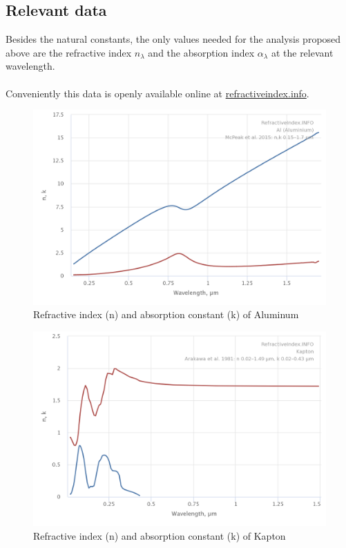\documentclass[14pt]{article}
\begin{document}
\subsection{Relevant data}

Besides the natural constants, the only values needed for the analysis proposed above are the refractive index $n_{\lambda}$
and the absorption index $\alpha_{\lambda}$ at the relevant wavelength.\\
\\
Conveniently this data is openly available online at \hyperref{https://refractiveindex.info}{}{}{refractiveindex.info}\autocite{polyanskiy}.\\

\begin{figure}[H]
  \centering
  \includegraphics[width=12cm]{./resources/RefractiveIndexAl.png}
  \caption{Refractive index (n) and absorption constant (k) of Aluminum}
  \label{fig:complex_refraction_aliminum}
\end{figure}

\begin{figure}[H]
  \centering
  \includegraphics[width=12cm]{./resources/RefractiveIndexKapton.png}
  \caption{Refractive index (n) and absorption constant (k) of Kapton}
  \label{fig:complex_refraction_kapton}
\end{figure}
\end{document}
